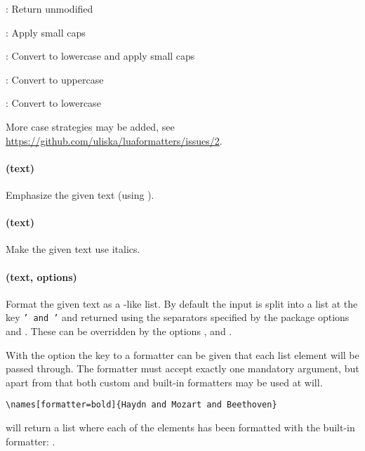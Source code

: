 \documentclass[12pt]{scrartcl}
\begin{document}
\begin{itemize*}
\item {}: Return unmodified
\item {}: Apply small caps
\item {}: Convert to lowercase and apply small caps
\item {}: Convert to uppercase
\item {}: Convert to lowercase
\end{itemize*}

\noindent More case strategies may be added, see
\url{https://github.com/uliska/luaformatters/issues/2}.

\paragraph{ (text)}

Emphasize the given text (using ).

\paragraph{ (text)}

Make the given text use italics.

\paragraph{ (text, options)}

Format the given text as a -like list.  By default the input
is split into a list at the key \texttt{' and '} and returned using the
separators specified by the package options  and
.  These can be overridden by the options
,  and .

With the option  the key to a formatter can be given that each
list element will be passed through.  The formatter must accept exactly one
mandatory argument, but apart from that both custom and built-in formatters may
be used at will.

\begin{verbatim}
\names[formatter=bold]{Haydn and Mozart and Beethoven}
\end{verbatim}

\noindent will return a list where each of the elements has been formatted with
the built-in  formatter: .
\end{document}
